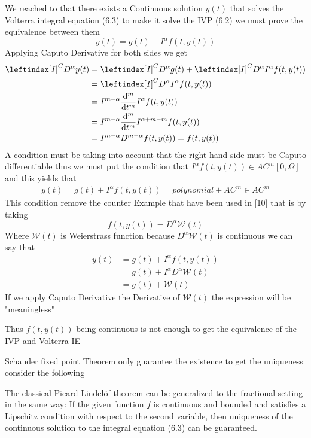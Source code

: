 We reached to that there exists a Continuous solution $y(t)$ that solves the Volterra integral equation (6.3)
to make it solve the IVP (6.2) we must prove the equivalence between them 
\[
    y(t) = g(t) + I^{\alpha}f(t,y(t))
\]
Applying Caputo Derivative for both sides we get 
\begin{align*}
    \leftindex[I]^C {D^{\alpha}} y(t) &= \leftindex[I]^C {D^{\alpha}} g(t) + \leftindex[I]^C {D^{\alpha}} I^{\alpha}f(t,y(t))
    \\
    &= \leftindex[I]^C {D^{\alpha}} I^{\alpha}f(t,y(t))
    \\
    &= I^{m-\alpha} \dv[m]{}{t} I^{\alpha}f(t,y(t))
    \\
    &= I^{m-\alpha} \dv[m]{}{t} I^{\alpha+m-m}f(t,y(t))
    \\
    &= I^{m-\alpha} D^{m-\alpha}f(t,y(t)) = f(t,y(t))
\end{align*}
A condition must be taking into account that the right hand side must be Caputo differentiable thus 
we must put the condition that $I^{\alpha}f(t,y(t)) \in AC^{m}[0,\Omega]$ and this yields that 
\begin{align*}
    y(t) = g(t) + I^{\alpha}f(t,y(t)) = polynomial + AC^{m} \in AC^{m}
\end{align*}
This condition remove the counter Example that have been used in [10] that is by taking 
\[
    f(t,y(t)) = D^\alpha \mathcal{W}(t)
\]
Where $\mathcal{W}(t)$ is Weierstrass function because $D^\alpha \mathcal{W}(t)$ is continuous
we can say that 
\begin{align*}
    y(t) &= g(t) + I^{\alpha}f(t,y(t))
    \\
    &= g(t) + I^{\alpha} D^\alpha \mathcal{W}(t)
    \\
    &= g(t) + \mathcal{W}(t)
\end{align*}
If we apply Caputo Derivative the Derivative of $\mathcal{W}(t)$ the expression will be "meaningless"

Thus $f(t,y(t))$ being continuous is not enough to get the equivalence of the IVP and Volterra IE%


Schauder fixed point Theorem only guarantee the existence to get the uniqueness consider the following

The classical Picard-Lindelöf theorem can be generalized to the fractional setting
in the same way: If the given function $f$ is continuous and bounded and satisfies 
a Lipschitz condition with respect to the second variable, then uniqueness of the 
continuous solution to the integral equation (6.3) can be guaranteed.

